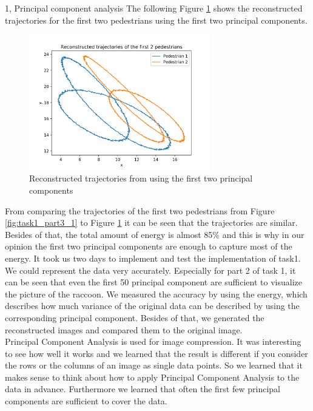 \documentclass[10pt,a4paper]{article}
\begin{document}
\begin{task}{1, Principal component analysis}
The following Figure \ref{fig:task1_part3_2} shows the reconstructed trajectories for the first two pedestrians using the first two principal components.
\begin{figure}[H]
\centering
\includegraphics[width=0.7\textwidth]{../plots/task1/Task1_3reconstructed.png}
\caption{Reconstructed trajectories from using the first two principal components}
\label{fig:task1_part3_2}
\end{figure}
From comparing the trajectories of the first two pedestrians from Figure \ref{fig:task1_part3_1} to Figure \ref{fig:task1_part3_2} it can be seen that the trajectories are similar. Besides of that, the total amount of energy is almost 85\% and this is why in our opinion the first two principal components are enough to capture most of the energy.
\bigbreak
It took us two days to implement and test the implementation of task1. \\
We could represent the data very accurately. Especially for part 2 of task 1, it can be seen that even the first 50 principal component are sufficient to visualize the picture of the raccoon. We measured the accuracy by using the energy, which describes how much variance of the original data can be described by using the corresponding principal component. Besides of that, we generated the reconstructed images and compared them to the original image. \\
Principal Component Analysis is used for image compression. It was interesting to see how well it works and we learned that the result is different if you consider the rows or the columns of an image as single data points. So we learned that it makes sense to think about how to apply Principal Component Analysis to the data in advance. Furthermore we learned that often the first few principal components are sufficient to cover the data. \\
\end{task}
\end{document}
